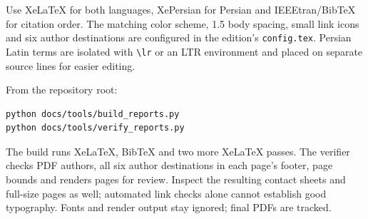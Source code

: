 Use XeLaTeX for both languages, XePersian for Persian and IEEEtran/BibTeX for citation order. The matching color scheme, 1.5 body spacing, small link icons and six author destinations are configured in the edition's \texttt{config.tex}. Persian Latin terms are isolated with \texttt{\textbackslash lr} or an LTR environment and placed on separate source lines for easier editing.

From the repository root:
\begin{lstlisting}[language={},numbers=none]
python docs/tools/build_reports.py
python docs/tools/verify_reports.py
\end{lstlisting}
The build runs XeLaTeX, BibTeX and two more XeLaTeX passes. The verifier checks PDF authors, all six author destinations in each page's footer, page bounds and renders pages for review. Inspect the resulting contact sheets and full-size pages as well; automated link checks alone cannot establish good typography. Fonts and render output stay ignored; final PDFs are tracked.
